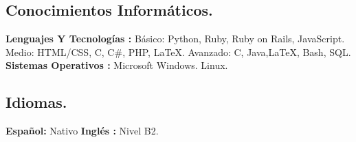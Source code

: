 \documentclass[10pt,letterpaper]{article}
\newenvironment{indentsection}[1]%
{\begin{list}{}%
	{\setlength{\leftmargin}{#1}}%
	\item[]%
}
{\end{list}}
\newcommand{\CPP}
{C\nolinebreak[4]\hspace{-.05em}\raisebox{.22ex}{\footnotesize\bf ++}}
\begin{document}
\begin{itemize}
\begin{itemize}
\end{itemize}



\vspace{-0.4em}
\subsection*{Conocimientos Informáticos.}

\begin{indentsection}{\parindent}
\begin{description*}
	 \textbf{Lenguajes Y Tecnologías :}	
		\subitem Básico: Python, Ruby, Ruby on Rails, JavaScript.
		\subitem Medio: HTML/CSS, \CPP, C\#, PHP, \LaTeX.
		\subitem Avanzado: C, Java,\LaTeX, Bash, SQL.\\
	 \textbf{Sistemas Operativos :}			
		 \subitem Microsoft Windows.
		 \subitem Linux.
		

\end{description*}
\end{indentsection}

\subsection*{Idiomas.}

\begin{indentsection}{\parindent}
	\begin{description*}
		
		\subitem \textbf{Español:} Nativo
		\subitem \textbf{Inglés :} Nivel B2.
		
	\end{description*}
\end{indentsection}

\end{itemize}
\end{document}

